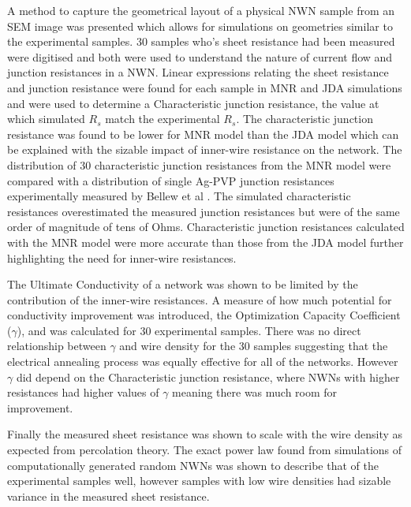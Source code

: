 A method to capture the geometrical layout of a physical NWN sample from an SEM image was presented which allows for simulations on geometries similar to the experimental samples. 30 samples who's sheet resistance had been measured were digitised and both were used to understand the nature of current flow and junction resistances in a NWN. Linear expressions relating the sheet resistance and junction resistance were found for each sample in MNR and JDA simulations and were used to determine a Characteristic junction resistance, the value at which simulated $R_s$ match the experimental $R_s$. The characteristic junction resistance was found to be lower for MNR model than the JDA model which can be explained with the sizable impact of inner-wire resistance on the network. The distribution  of 30 characteristic junction resistances from the MNR model were compared with a distribution of single Ag-PVP junction resistances experimentally measured by Bellew et al \cite{bellew2015}. The simulated characteristic resistances overestimated the measured junction resistances but were of the same order of magnitude of tens of Ohms. Characteristic junction resistances calculated with the MNR model were more accurate than those from the JDA model further highlighting the need for inner-wire resistances.

The Ultimate Conductivity of a network was shown to be limited by the contribution of the inner-wire resistances. A measure of how much potential for conductivity improvement was introduced, the Optimization Capacity Coefficient ($\gamma$), and was calculated for 30 experimental samples. There was no direct relationship between $\gamma$ and wire density for the 30 samples suggesting that the electrical annealing process was equally effective for all of the networks. However $\gamma$ did depend on the Characteristic junction resistance, where NWNs with higher resistances had higher values of $\gamma$ meaning there was much room for improvement.

Finally the measured sheet resistance was shown to scale with the wire density as expected from percolation theory. The exact power law found from simulations of computationally generated random NWNs was shown to describe that of the experimental samples well, however samples with low wire densities had sizable variance in the measured sheet resistance.




